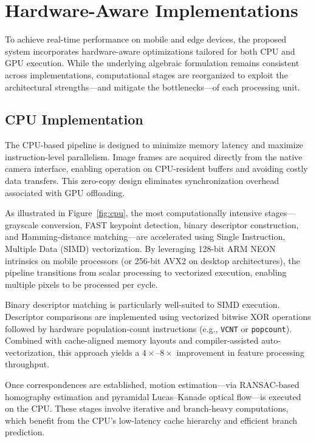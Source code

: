 \section{Hardware-Aware Implementations}

To achieve real-time performance on mobile and edge devices, the proposed system incorporates hardware-aware optimizations tailored for both CPU and GPU execution. While the underlying algebraic formulation remains consistent across implementations, computational stages are reorganized to exploit the architectural strengths—and mitigate the bottlenecks—of each processing unit.

\subsection{CPU Implementation}



The CPU-based pipeline is designed to minimize memory latency and maximize instruction-level parallelism. Image frames are acquired directly from the native camera interface, enabling operation on CPU-resident buffers and avoiding costly data transfers. This zero-copy design eliminates synchronization overhead associated with GPU offloading.

As illustrated in Figure~\ref{fig:cpu}, the most computationally intensive stages—grayscale conversion, FAST keypoint detection, binary descriptor construction, and Hamming-distance matching—are accelerated using Single Instruction, Multiple Data (SIMD) vectorization. By leveraging 128-bit ARM NEON intrinsics on mobile processors (or 256-bit AVX2 on desktop architectures), the pipeline transitions from scalar processing to vectorized execution, enabling multiple pixels to be processed per cycle.

Binary descriptor matching is particularly well-suited to SIMD execution. Descriptor comparisons are implemented using vectorized bitwise XOR operations followed by hardware population-count instructions (e.g., \texttt{VCNT} or \texttt{popcount}). Combined with cache-aligned memory layouts and compiler-assisted auto-vectorization, this approach yields a $4\times$–$8\times$ improvement in feature processing throughput.

Once correspondences are established, motion estimation—via RANSAC-based homography estimation and pyramidal Lucas--Kanade optical flow—is executed on the CPU. These stages involve iterative and branch-heavy computations, which benefit from the CPU's low-latency cache hierarchy and efficient branch prediction.


